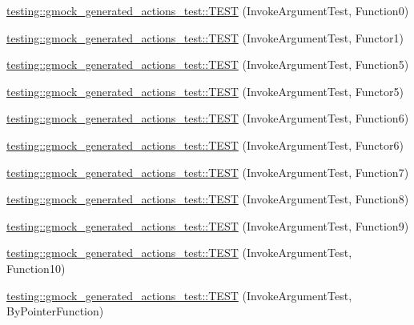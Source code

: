 \begin{DoxyCompactItemize}
\mbox{\hyperlink{namespacetesting_1_1gmock__generated__actions__test_aee4ab8d88ec59a7e3b91d919a6ed34da}{testing\+::gmock\+\_\+generated\+\_\+actions\+\_\+test\+::\+T\+E\+ST}} (Invoke\+Argument\+Test, Function0)
\item 
\mbox{\hyperlink{namespacetesting_1_1gmock__generated__actions__test_a47d12c8e504971d1f1c17df8d90bff82}{testing\+::gmock\+\_\+generated\+\_\+actions\+\_\+test\+::\+T\+E\+ST}} (Invoke\+Argument\+Test, Functor1)
\item 
\mbox{\hyperlink{namespacetesting_1_1gmock__generated__actions__test_a6afe3cf31ef3f5a9d6fd6af05c9de95c}{testing\+::gmock\+\_\+generated\+\_\+actions\+\_\+test\+::\+T\+E\+ST}} (Invoke\+Argument\+Test, Function5)
\item 
\mbox{\hyperlink{namespacetesting_1_1gmock__generated__actions__test_aab59917791fb297d6735d46e9a862be1}{testing\+::gmock\+\_\+generated\+\_\+actions\+\_\+test\+::\+T\+E\+ST}} (Invoke\+Argument\+Test, Functor5)
\item 
\mbox{\hyperlink{namespacetesting_1_1gmock__generated__actions__test_ae3f8bdac5c2ea1cf56ff1484ebb9a44e}{testing\+::gmock\+\_\+generated\+\_\+actions\+\_\+test\+::\+T\+E\+ST}} (Invoke\+Argument\+Test, Function6)
\item 
\mbox{\hyperlink{namespacetesting_1_1gmock__generated__actions__test_a789c7e8ee88243dc4a53841f6a8da3c6}{testing\+::gmock\+\_\+generated\+\_\+actions\+\_\+test\+::\+T\+E\+ST}} (Invoke\+Argument\+Test, Functor6)
\item 
\mbox{\hyperlink{namespacetesting_1_1gmock__generated__actions__test_a3e13c2ccf384c80c66116418e1b3ccde}{testing\+::gmock\+\_\+generated\+\_\+actions\+\_\+test\+::\+T\+E\+ST}} (Invoke\+Argument\+Test, Function7)
\item 
\mbox{\hyperlink{namespacetesting_1_1gmock__generated__actions__test_a5d583a32b46a306139d32ea9a1d575a9}{testing\+::gmock\+\_\+generated\+\_\+actions\+\_\+test\+::\+T\+E\+ST}} (Invoke\+Argument\+Test, Function8)
\item 
\mbox{\hyperlink{namespacetesting_1_1gmock__generated__actions__test_a3a278f02e1633feda3dea30d810a49ea}{testing\+::gmock\+\_\+generated\+\_\+actions\+\_\+test\+::\+T\+E\+ST}} (Invoke\+Argument\+Test, Function9)
\item 
\mbox{\hyperlink{namespacetesting_1_1gmock__generated__actions__test_afe4653b181e199417b004c4485152010}{testing\+::gmock\+\_\+generated\+\_\+actions\+\_\+test\+::\+T\+E\+ST}} (Invoke\+Argument\+Test, Function10)
\item 
\mbox{\hyperlink{namespacetesting_1_1gmock__generated__actions__test_ac3ff9db96cb7a664ef44d20eb0a7a71f}{testing\+::gmock\+\_\+generated\+\_\+actions\+\_\+test\+::\+T\+E\+ST}} (Invoke\+Argument\+Test, By\+Pointer\+Function)

\end{DoxyCompactItemize}
